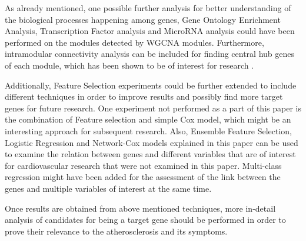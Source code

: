 \documentclass{ba-kecs}
\numberwithin{figure}{section}
\numberwithin{equation}{section}
\begin{document}
As already mentioned, one possible further analysis for better understanding of the biological processes happening among genes, Gene Ontology Enrichment Analysis, Transcription Factor analysis and MicroRNA analysis could have been performed on the modules detected by WGCNA modules. Furthermore, intramodular connectivity analysis can be included for finding central hub genes of each module, which has been shown to be of interest for research \cite{wgcna2}.

Additionally, Feature Selection experiments could be further extended to include different techniques in order to improve results and possibly find more target genes for future research. One experiment not performed as a part of this paper is the combination of Feature selection and simple Cox model, which might be an interesting approach for subsequent research. Also, Ensemble Feature Selection, Logistic Regression and Network-Cox models explained in this paper can be used to examine the relation between genes and different variables that are of interest for cardiovascular research that were not examined in this paper. Multi-class regression might have been added for the assessment of the link between the genes and multiple variables of interest at the same time.

Once results are obtained from above mentioned techniques, more in-detail analysis of candidates for being a target gene should be performed in order to prove their relevance to the atherosclerosis and its symptoms.



\end{document}
